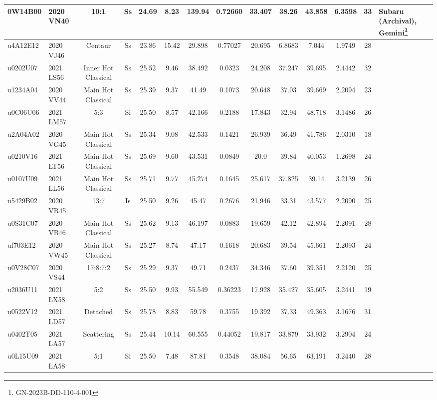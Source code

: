 \begin{longrotatetable}
\begin{longtable}{ll|ccccccccccc | l}
0W14B00 & 2020 VN40 & 10:1 & Ss & 24.69 & 8.23 & 139.94 & 0.72660 & 33.407 & 38.26 & 43.858 & 6.3598 & 33 & Subaru (Archival), Gemini\footnote{GN-2023B-DD-110-4-001}  \\ 
\hline
u4A12E12 & 2020 VJ46 & Centaur & Ss & 23.86 & 15.42 & 29.898 & 0.77027 & 20.695 & 6.8683 & 7.044 & 1.9749 & 28 & \\ 
u0202U07 & 2021 LS56 & Inner Hot Classical & Ss & 25.52 & 9.46 & 38.492 & 0.0323 & 24.208 & 37.247 & 39.695 & 2.4442 & 32 & \\ 
u1234A04 & 2020 VV44 & Main Hot Classical & Ss & 25.39 & 9.37 & 41.49 & 0.1073 & 20.648 & 37.03 & 39.669 & 2.2094 & 23 & \\ 
u0C06U06 & 2021 LM57 & 5:3 & Si & 25.50 & 8.57 & 42.166 & 0.2188 & 17.843 & 32.94 & 48.718 & 3.1486 & 26 & \\ 
u2A04A02 & 2020 VG45 & Main Hot Classical & Ss & 25.34 & 9.08 & 42.533 & 0.1421 & 26.939 & 36.49 & 41.786 & 2.0310 & 18 & \\ 
u0210V16 & 2021 LT56 & Main Hot Classical & Ss & 25.69 & 9.60 & 43.531 & 0.0849 & 20.0 & 39.84 & 40.053 & 1.2698 & 24 & \\ 
u0107U09 & 2021 LL56 & Main Hot Classical & Ss & 25.71 & 9.77 & 45.274 & 0.1645 & 25.617 & 37.825 & 39.14 & 3.2139 & 26 & \\ 
u5429B02 & 2020 VR45 & 13:7 & Is & 25.50 & 9.26 & 45.47 & 0.2676 & 21.946 & 33.31 & 43.577 & 2.2090 & 25 & \\ 
u0S31C07 & 2020 VB46 & Main Hot Classical & Ss & 25.62 & 9.13 & 46.197 & 0.0883 & 19.659 & 42.12 & 42.894 & 2.2091 & 28 & \\ 
uf703E12 & 2020 VW45 & Main Hot Classical & Ss & 25.27 & 8.74 & 47.17 & 0.1618 & 20.683 & 39.54 & 45.661 & 2.2093 & 24 & \\ 
u0V28C07 & 2020 VS44 & 17:8:7:2 & Ss & 25.29 & 9.37 & 49.71 & 0.2437 & 34.346 & 37.60 & 39.351 & 2.2120 & 25 & \\ 
u2036U11 & 2021 LX58 & 5:2 & Ss & 25.50 & 9.93 & 55.549 & 0.36223 & 17.928 & 35.427 & 35.605 & 3.2441 & 19 & \\ 
u0522V12 & 2021 LD57 & Detached & Ss & 25.78 & 8.83 & 59.78 & 0.3755 & 19.392 & 37.33 & 49.363 & 3.1676 & 31 & \\ 
u0402T05 & 2021 LA57 & Scattering & Ss & 25.44 & 10.14 & 60.555 & 0.44052 & 19.817 & 33.879 & 33.932 & 3.2904 & 24 & \\ 
u0L15U09 & 2021 LA58 & 5:1 & Si & 25.50 & 7.48 & 87.81 & 0.3548 & 38.084 & 56.65 & 63.191 & 3.2440 & 28 & \\ 

\end{longtable}
\end{longrotatetable}
